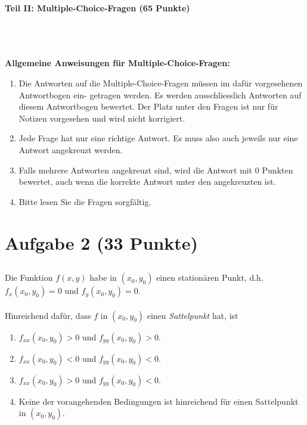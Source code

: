 \begin{Large}
\textbf{Teil II: Multiple-Choice-Fragen (65 Punkte)}
\end{Large}
\\
\\
\\
\textbf{Allgemeine Anweisungen für Multiple-Choice-Fragen:}
\\
\renewcommand{\labelenumi}{(\roman{enumi})}
\begin{enumerate}
\item
Die Antworten auf die Multiple-Choice-Fragen müssen im dafür vorgesehenen Antwortbogen ein-
getragen werden. Es werden ausschliesslich Antworten auf diesem Antwortbogen bewertet. Der
Platz unter den Fragen ist nur für Notizen vorgesehen und wird nicht korrigiert.

\item
Jede Frage hat nur eine richtige Antwort. Es muss also auch jeweils nur eine Antwort angekreuzt
werden.

\item
Falls mehrere Antworten angekreuzt sind, wird die Antwort mit 0 Punkten bewertet, auch wenn
die korrekte Antwort unter den angekreuzten ist.

\item
Bitte lesen Sie die Fragen sorgfältig.

\end{enumerate}
\newpage
\section*{Aufgabe 2 (33 Punkte)}
\vspace{0.4cm}
\subsection*{}
Die Funktion $ f(x,y) $ habe in $ (x_0,y_0) $ einen stationären Punkt, d.h. $ f_x(x_0,y_0)= 0 $ und $ f_y(x_0,y_0) = 0 $.\\
\\
Hinreichend dafür, dass $ f $ in $ (x_0,y_0) $ einen \textit{Sattelpunkt} hat, ist
 \renewcommand{\labelenumi}{(\alph{enumi})}
\begin{enumerate}
\item $ f_{xx}(x_0,y_0) > 0 $ und $ f_{yy}(x_0,y_0) >0 $.
\item $ f_{xx}(x_0,y_0) < 0 $ und $ f_{yy}(x_0,y_0) <0 $.
\item $ f_{xx}(x_0,y_0) > 0 $ und $ f_{yy}(x_0,y_0) <0 $.
\item Keine der vorangehenden Bedingungen ist hinreichend für einen Sattelpunkt in $ (x_0,y_0) $.
\end{enumerate}
\ \\
